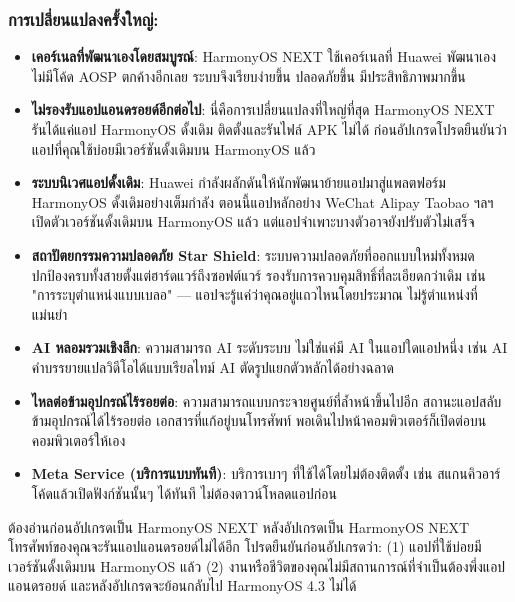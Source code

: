 \subsubsection*{การเปลี่ยนแปลงครั้งใหญ่:}

\begin{itemize}
  \item \textbf{เคอร์เนลที่พัฒนาเองโดยสมบูรณ์}: HarmonyOS NEXT ใช้เคอร์เนลที่ Huawei พัฒนาเอง ไม่มีโค้ด AOSP ตกค้างอีกเลย ระบบจึงเรียบง่ายขึ้น ปลอดภัยขึ้น มีประสิทธิภาพมากขึ้น
  \item \textbf{ไม่รองรับแอปแอนดรอยด์อีกต่อไป}: นี่คือการเปลี่ยนแปลงที่ใหญ่ที่สุด HarmonyOS NEXT รันได้แค่แอป HarmonyOS ดั้งเดิม ติดตั้งและรันไฟล์ APK ไม่ได้ ก่อนอัปเกรดโปรดยืนยันว่าแอปที่คุณใช้บ่อยมีเวอร์ชันดั้งเดิมบน HarmonyOS แล้ว
  \item \textbf{ระบบนิเวศแอปดั้งเดิม}: Huawei กำลังผลักดันให้นักพัฒนาย้ายแอปมาสู่แพลตฟอร์ม HarmonyOS ดั้งเดิมอย่างเต็มกำลัง ตอนนี้แอปหลักอย่าง WeChat Alipay Taobao ฯลฯ เปิดตัวเวอร์ชันดั้งเดิมบน HarmonyOS แล้ว แต่แอปจำเพาะบางตัวอาจยังปรับตัวไม่เสร็จ
  \item \textbf{สถาปัตยกรรมความปลอดภัย Star Shield}: ระบบความปลอดภัยที่ออกแบบใหม่ทั้งหมด ปกป้องครบทั้งสายตั้งแต่ฮาร์ดแวร์ถึงซอฟต์แวร์ รองรับการควบคุมสิทธิ์ที่ละเอียดกว่าเดิม เช่น "การระบุตำแหน่งแบบเบลอ" — แอปจะรู้แค่ว่าคุณอยู่แถวไหนโดยประมาณ ไม่รู้ตำแหน่งที่แม่นยำ
  \item \textbf{AI หลอมรวมเชิงลึก}: ความสามารถ AI ระดับระบบ ไม่ใช่แค่มี AI ในแอปใดแอปหนึ่ง เช่น AI คำบรรยายแปลวิดีโอได้แบบเรียลไทม์ AI ตัดรูปแยกตัวหลักได้อย่างฉลาด
  \item \textbf{ไหลต่อข้ามอุปกรณ์ไร้รอยต่อ}: ความสามารถแบบกระจายศูนย์ที่ล้ำหน้าขึ้นไปอีก สถานะแอปสลับข้ามอุปกรณ์ได้ไร้รอยต่อ เอกสารที่แก้อยู่บนโทรศัพท์ พอเดินไปหน้าคอมพิวเตอร์ก็เปิดต่อบนคอมพิวเตอร์ให้เอง
  \item \textbf{Meta Service (บริการแบบทันที)}: บริการเบาๆ ที่ใช้ได้โดยไม่ต้องติดตั้ง เช่น สแกนคิวอาร์โค้ดแล้วเปิดฟังก์ชันนั้นๆ ได้ทันที ไม่ต้องดาวน์โหลดแอปก่อน
\end{itemize}

\begin{tcbwarn}{ต้องอ่านก่อนอัปเกรดเป็น HarmonyOS NEXT}
หลังอัปเกรดเป็น HarmonyOS NEXT โทรศัพท์ของคุณจะรันแอปแอนดรอยด์ไม่ได้อีก โปรดยืนยันก่อนอัปเกรดว่า: (1) แอปที่ใช้บ่อยมีเวอร์ชันดั้งเดิมบน HarmonyOS แล้ว (2) งานหรือชีวิตของคุณไม่มีสถานการณ์ที่จำเป็นต้องพึ่งแอปแอนดรอยด์ และหลังอัปเกรดจะย้อนกลับไป HarmonyOS 4.3 ไม่ได้

\end{tcbwarn}

